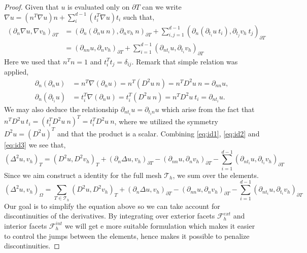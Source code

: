 \documentclass[11pt]{article}
\theoremstyle{remark}
\numberwithin{equation}{section}
\begin{document}
\begin{proof}
Given that $u$ is evaluated only on $\partial T$ can we write
$\nabla u = \left( n^{T} \nabla u   \right) n + \sum_i^{d-1} \left( t_i^{T} \nabla u   \right) t_i$ such that,
\begin{equation}
\label{eq:id3}
    \begin{split}
(  \partial_n\nabla u, \nabla v_h ) _{\partial_{} T  } & =  ( \partial _{n} ( \partial_{n}u \ n), \partial _{n} v_h \ n )_{\partial T}   +\sum_{i,j=1}^{d-1} ( \partial _{n} ( \partial_{t_{i}}u \ t_{i}), \partial _{t_{j}} v_h \ t_{j} )_{\partial T} \\
& =  ( \partial _{nn} u, \partial _{n} v_h  )_{\partial T}+\sum_{i=1}^{d-1} ( \partial _{n t_{i}}u , \partial _{t_{i}} v_h  )_{\partial T}
    \end{split}
\end{equation}
Here we used that $n^{T} n = 1$ and $t_{i}^{T} t_{j} = \delta_{ij}$.
Remark that simple relation was applied,
    \begin{align*}
\partial_n (\partial_n u)  & = n^T \nabla (\partial_n u)  = n ^T (D^2 u \ n)  = n^{T} D^2 u \ n = \partial _{nn} u, \\
\partial_n (\partial_{t_{i}} u)  & = t_{i}^T \nabla (\partial_n u)  = t_i^T (D^2 u \ n )   = n^{T} D^2 u \ t_{i} = \partial _{n t_{i}} u.
    \end{align*}
We may also deduce the relationship $\partial _{nt_{i}} u = \partial _{t_{i}n}u$ which arise from the fact that $n^{T} D^2u \ t_{i} = ( t_{i}^{T} D^2u \  n)^T = t_{i}^{T}  D^2u \  n$, where we utilized the symmetry $D^2u = ( D^2u) ^{T} $ and that the
product is a scalar.
Combining \eqref{eq:id1}, \eqref{eq:id2} and \eqref{eq:id3} we see that,
\[
    ( \Delta ^2 u, v_h) _{T}   = ( D^2 u, D^2v_h)_{T } + ( \partial _{n}  \Delta u, v_h )_{\partial T} -( \partial _{nn}u , \partial _{n} v_h  )_{\partial T}-\sum_{i=1}^{d-1} ( \partial _{n t_{i}}u, \partial _{t_{i}} v_h  )_{\partial T}
\]
Since we aim construct a identity for the full mesh $\mathcal{T} _{h}$, we sum over the elements.
\begin{equation}
\label{eq:bi_basic_dg2}
\left( \Delta  ^{2} u,v_h \right) _{\Omega } = \sum_{T \in  \mathcal{T} _{h}}^{}  ( D^2 u, D^2v_h)_{T } + ( \partial _{n}  \Delta u, v_h )_{\partial T} -( \partial _{nn}u , \partial _{n} v_h  )_{\partial T}-\sum_{i=1}^{d-1} ( \partial _{n t_{i}} u , \partial _{t_{i}} v_h  )_{\partial T}
\end{equation}
Our goal is to simplify the equation above so we can take account for discontinuities of the derivatives.
By integrating over exterior facets $\mathcal{F} _{h}^{ext}$ and interior facets $\mathcal{F} _{h}^{int}$ we will get e more suitable formulation which makes it easier to control the jumps between the elements, hence makes it possible to penalize discontinuities.


\end{proof}
\end{document}
